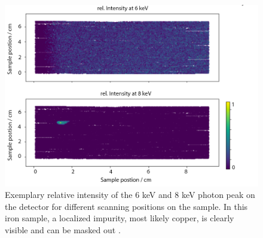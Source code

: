 


\begin{figure}
	\centering
	\includegraphics[width=0.9\linewidth]{images/xrf.png}
	\caption[Exemplary relative intensity of the 6 keV and 8 keV photon peak on the detector for different scanning positions on the sample]{Exemplary relative intensity of the 6 keV and 8 keV photon peak on the detector for different scanning positions on the sample. In this iron sample, a localized impurity, most likely copper, is clearly visible and can be masked out .}
\end{figure}

